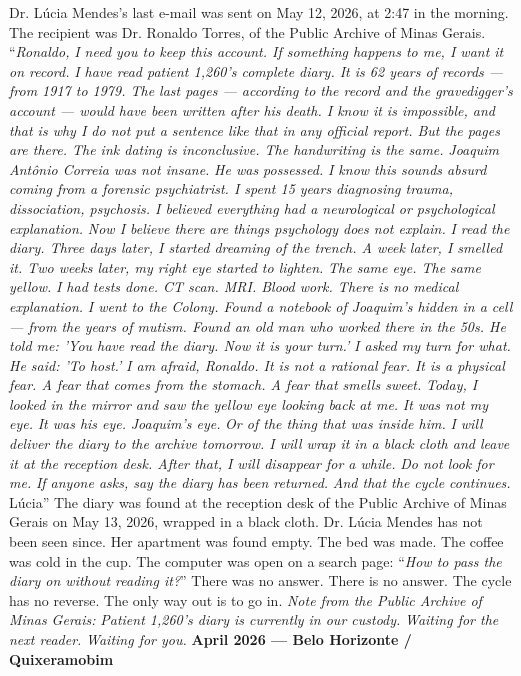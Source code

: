\noindent Dr. Lúcia Mendes's last e-mail was sent on May 12, 2026, at 2:47 in the morning.
\noindent The recipient was Dr. Ronaldo Torres, of the Public Archive of Minas Gerais.
\noindent \textquotedblleft{\textit{Ronaldo,}}
\noindent \textit{I need you to keep this account. If something happens to me, I want it on record.}
\noindent \textit{I have read patient 1,260's complete diary. It is 62 years of records --- from 1917 to 1979. The last pages --- according to the record and the gravedigger's account --- would have been written after his death. I know it is impossible, and that is why I do not put a sentence like that in any official report. But the pages are there. The ink dating is inconclusive. The handwriting is the same.}
\noindent \textit{Joaquim Antônio Correia was not insane.}
\noindent \textit{He was possessed.}
\noindent \textit{I know this sounds absurd coming from a forensic psychiatrist. I spent 15 years diagnosing trauma, dissociation, psychosis. I believed everything had a neurological or psychological explanation.}
\noindent \textit{Now I believe there are things psychology does not explain.}
\noindent \textit{I read the diary. Three days later, I started dreaming of the trench. A week later, I smelled it. Two weeks later, my right eye started to lighten.}
\noindent \textit{The same eye. The same yellow.}
\noindent \textit{I had tests done. CT scan. MRI. Blood work. There is no medical explanation.}
\noindent \textit{I went to the Colony. Found a notebook of Joaquim's hidden in a cell --- from the years of mutism. Found an old man who worked there in the 50s. He told me: 'You have read the diary. Now it is your turn.'}
\noindent \textit{I asked my turn for what. He said: 'To host.'}
\noindent \textit{I am afraid, Ronaldo. It is not a rational fear. It is a physical fear. A fear that comes from the stomach. A fear that smells sweet.}
\noindent \textit{Today, I looked in the mirror and saw the yellow eye looking back at me.}
\noindent \textit{It was not my eye.}
\noindent \textit{It was his eye.}
\noindent \textit{Joaquim's eye.}
\noindent \textit{Or of the thing that was inside him.}
\noindent \textit{I will deliver the diary to the archive tomorrow. I will wrap it in a black cloth and leave it at the reception desk. After that, I will disappear for a while.}
\noindent \textit{Do not look for me.}
\noindent \textit{If anyone asks, say the diary has been returned.}
\noindent \textit{And that the cycle continues.}
\noindent Lúcia\textquotedblright{}
\noindent The diary was found at the reception desk of the Public Archive of Minas Gerais on May 13, 2026, wrapped in a black cloth.
\noindent Dr. Lúcia Mendes has not been seen since.
\noindent Her apartment was found empty. The bed was made. The coffee was cold in the cup. The computer was open on a search page: \textquotedblleft{\textit{How to pass the diary on without reading it?}\textquotedblright}
\noindent There was no answer.
\noindent There is no answer.
\noindent The cycle has no reverse.
\noindent The only way out is to go in.
\noindent \textit{Note from the Public Archive of Minas Gerais:}
\noindent \textit{Patient 1,260's diary is currently in our custody.}
\noindent \textit{Waiting for the next reader.}
\noindent \textit{Waiting for you.}
\noindent \textbf{April 2026 --- Belo Horizonte / Quixeramobim}

